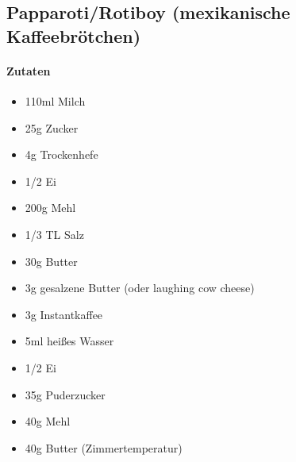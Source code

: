 \newpage
\subsection{Papparoti/Rotiboy (mexikanische Kaffeebrötchen)}
\paragraph{Zutaten}
\begin{itemize}[noitemsep]
	\item 110ml Milch
	\item 25g Zucker
	\item 4g Trockenhefe
	\item 1/2 Ei
	\item 200g Mehl
	\item 1/3 TL Salz
	\item 30g Butter
	\item 3g gesalzene Butter (oder laughing cow cheese)
	\vspace{0.5cm}
	\item 3g Instantkaffee
	\item 5ml heißes Wasser
	\item 1/2 Ei
	\item 35g Puderzucker
	\item 40g Mehl
	\item 40g Butter (Zimmertemperatur)
\end{itemize}
